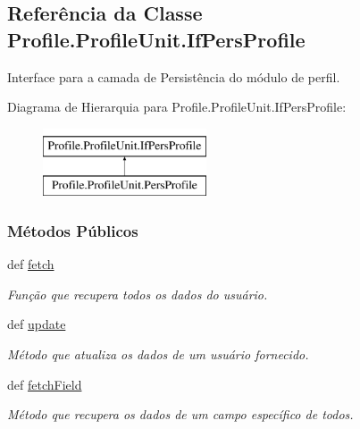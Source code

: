 \hypertarget{classProfile_1_1ProfileUnit_1_1IfPersProfile}{\subsection{Referência da Classe Profile.\-Profile\-Unit.\-If\-Pers\-Profile}
\label{classProfile_1_1ProfileUnit_1_1IfPersProfile}
}


Interface para a camada de Persistência do módulo de perfil.  


Diagrama de Hierarquia para Profile.\-Profile\-Unit.\-If\-Pers\-Profile\-:\begin{figure}[H]
\begin{center}
\leavevmode
\includegraphics[height=2.000000cm]{d2/dec/classProfile_1_1ProfileUnit_1_1IfPersProfile}
\end{center}
\end{figure}
\subsubsection*{Métodos Públicos}
\begin{DoxyCompactItemize}
\item 
def \hyperlink{classProfile_1_1ProfileUnit_1_1IfPersProfile_a64821aed51d9e9d64f6da9ee9b20fdeb}{fetch}
\begin{DoxyCompactList}\small\item\em Função que recupera todos os dados do usuário. \end{DoxyCompactList}\item 
def \hyperlink{classProfile_1_1ProfileUnit_1_1IfPersProfile_ae2d65e1ead2780de7b97fab078bb425e}{update}
\begin{DoxyCompactList}\small\item\em Método que atualiza os dados de um usuário fornecido. \end{DoxyCompactList}\item 
def \hyperlink{classProfile_1_1ProfileUnit_1_1IfPersProfile_aaa886f8741f0b2ca562968cf9a688aa7}{fetch\-Field}
\begin{DoxyCompactList}\small\item\em Método que recupera os dados de um campo específico de todos. \end{DoxyCompactList}\end{DoxyCompactItemize}


